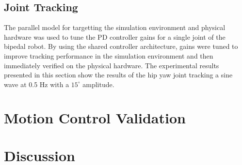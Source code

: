 \subsection{Joint Tracking} %
\label{sub:joint_tracking}
The parallel model for targetting the simulation environment and physical hardware was used to tune the PD controller gains for a single joint of the bipedal robot. By using the shared controller architecture, gains were tuned to improve tracking performance in the simulation environment and then immediately verified on the physical hardware. The experimental results presented in this section show the results of the hip yaw joint tracking a sine wave at 0.5 Hz with a $15^{\circ}$ amplitude. 

\Incomplete

\section{Motion Control Validation} %
\label{sec:motion_control_validation}
\Incomplete

\section{Discussion} %
\label{sec:experiments_discussion}
\Incomplete

